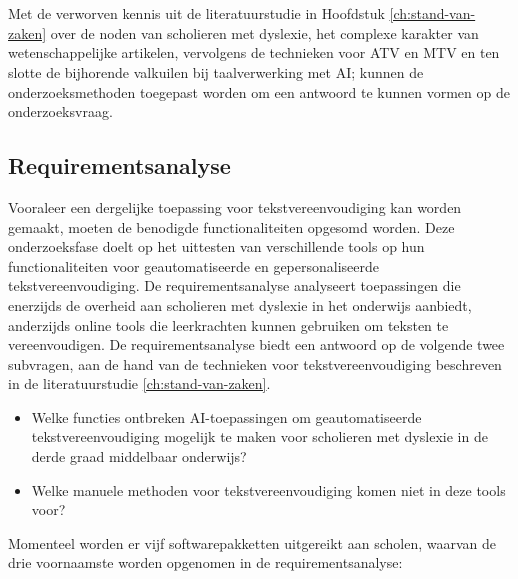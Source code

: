 
\chapter{}%
\label{ch:methodologie}

Met de verworven kennis uit de literatuurstudie in Hoofdstuk \ref{ch:stand-van-zaken} over de noden van scholieren met dyslexie, het complexe karakter van wetenschappelijke artikelen, vervolgens de technieken voor ATV en MTV en ten slotte de bijhorende valkuilen bij taalverwerking met AI; kunnen de onderzoeksmethoden toegepast worden om een antwoord te kunnen vormen op de onderzoeksvraag.

\section{Requirementsanalyse}
\label{sec:requirementsanalyse}

Vooraleer een dergelijke toepassing voor tekstvereenvoudiging kan worden gemaakt, moeten de benodigde functionaliteiten opgesomd worden. Deze onderzoeksfase doelt op het uittesten van verschillende tools op hun functionaliteiten voor geautomatiseerde en gepersonaliseerde tekstvereenvoudiging. De requirementsanalyse analyseert toepassingen die enerzijds de overheid aan scholieren met dyslexie in het onderwijs aanbiedt, anderzijds online tools die leerkrachten kunnen gebruiken om teksten te vereenvoudigen. De requirementsanalyse biedt een antwoord op de volgende twee subvragen, aan de hand van de technieken voor tekstvereenvoudiging beschreven in de literatuurstudie \ref{ch:stand-van-zaken}. 

\begin{itemize}
	\item Welke functies ontbreken AI-toepassingen om geautomatiseerde tekstvereenvoudiging mogelijk te maken voor scholieren met dyslexie in de derde graad middelbaar onderwijs?
	\item Welke manuele methoden voor tekstvereenvoudiging komen niet in deze tools voor?
\end{itemize}

Momenteel worden er vijf softwarepakketten uitgereikt aan scholen, waarvan de drie voornaamste worden opgenomen in de requirementsanalyse:

